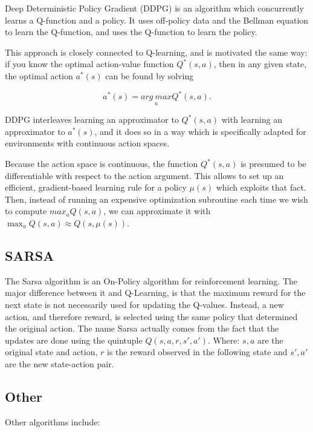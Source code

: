 \documentclass[letterpaper, 10 pt]{IEEEconf}
\begin{document}
Deep Deterministic Policy Gradient (DDPG) is an algorithm which
concurrently learns a Q-function and a policy. It uses off-policy data
and the Bellman equation to learn the Q-function, and uses the
Q-function to learn the policy.

This approach is closely connected to Q-learning, and is motivated the same way: if you know the optimal action-value function $Q^*(s,a)$, then in any given state, the optimal action $a^*(s)$ can be found by solving

$$
a^*(s) = \underset{a}{arg\ max} Q^*(s,a).
$$

DDPG interleaves learning an approximator to $Q^*(s,a)$ with learning an
approximator to $a^*(s)$, and it does so in a way which is specifically
adapted for environments with continuous action spaces.

Because the action space is continuous, the function $Q^*(s,a)$ is
presumed to be differentiable with respect to the action
argument. This allows to set up an efficient, gradient-based learning
rule for a policy $\mu(s)$ which exploits that fact. Then, instead of
running an expensive optimization subroutine each time we wish to
compute $max_a Q(s,a)$, we can approximate it with $\max_a Q(s,a)
\approx Q(s,\mu(s))$.


\subsection{SARSA~\cite{rummery1994line}}

The Sarsa algorithm is an On-Policy algorithm for reinforcement learning. The
major difference between it and Q-Learning, is that the maximum reward
for the next state is not necessarily used for updating the
Q-values. Instead, a new action, and therefore reward, is selected
using the same policy that determined the original action. The name
Sarsa actually comes from the fact that the updates are done using the
quintuple $Q(s, a, r, s', a')$. Where: $s, a$ are the original state and
action, $r$ is the reward observed in the following state and $s', a'$ are
the new state-action pair.

\subsection{Other}

Other algorithms include:
\end{document}
